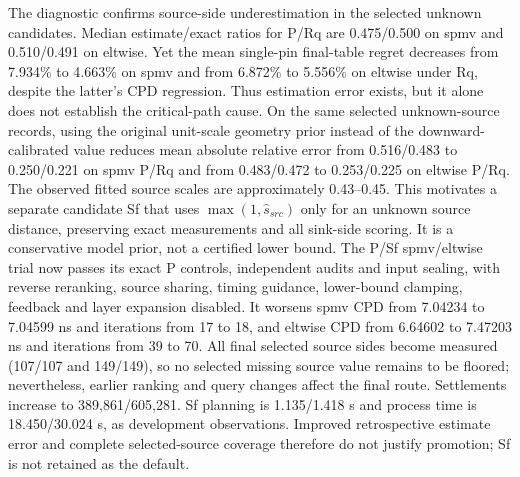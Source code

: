 \documentclass[conference,10pt]{IEEEtran}
\begin{document}
The diagnostic confirms source-side underestimation in the selected unknown candidates. Median estimate/exact ratios for P/Rq are 0.475/0.500 on spmv and 0.510/0.491 on eltwise. Yet the mean single-pin final-table regret decreases from 7.934\% to 4.663\% on spmv and from 6.872\% to 5.556\% on eltwise under Rq, despite the latter's CPD regression. Thus estimation error exists, but it alone does not establish the critical-path cause. On the same selected unknown-source records, using the original unit-scale geometry prior instead of the downward-calibrated value reduces mean absolute relative error from 0.516/0.483 to 0.250/0.221 on spmv P/Rq and from 0.483/0.472 to 0.253/0.225 on eltwise P/Rq. The observed fitted source scales are approximately 0.43--0.45. This motivates a separate candidate Sf that uses $\max(1,\hat{s}_{src})$ only for an unknown source distance, preserving exact measurements and all sink-side scoring. It is a conservative model prior, not a certified lower bound. The P/Sf spmv/eltwise trial now passes its exact P controls, independent audits and input sealing, with reverse reranking, source sharing, timing guidance, lower-bound clamping, feedback and layer expansion disabled. It worsens spmv CPD from 7.04234 to 7.04599 ns and iterations from 17 to 18, and eltwise CPD from 6.64602 to 7.47203 ns and iterations from 39 to 70. All final selected source sides become measured (107/107 and 149/149), so no selected missing source value remains to be floored; nevertheless, earlier ranking and query changes affect the final route. Settlements increase to 389,861/605,281. Sf planning is 1.135/1.418 s and process time is 18.450/30.024 s, as development observations. Improved retrospective estimate error and complete selected-source coverage therefore do not justify promotion; Sf is not retained as the default.
\end{document}
